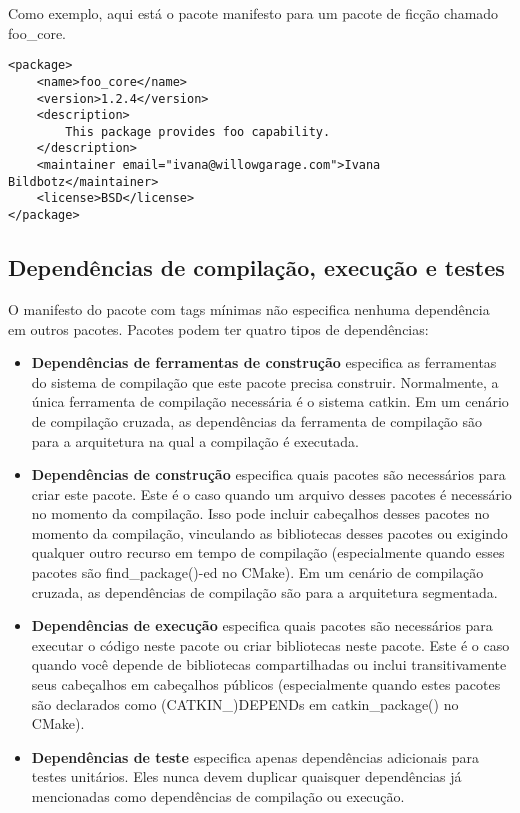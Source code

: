 Como exemplo, aqui está o pacote manifesto para um pacote de ficção chamado foo\_core.


\begin{verbatim}
<package>
	<name>foo_core</name>
	<version>1.2.4</version>
	<description>
		This package provides foo capability.
	</description>
	<maintainer email="ivana@willowgarage.com">Ivana Bildbotz</maintainer>
	<license>BSD</license>
</package>
\end{verbatim}

\subsection{Dependências de compilação, execução e testes}

O manifesto do pacote com tags mínimas não especifica nenhuma dependência em outros pacotes. Pacotes podem ter quatro tipos de dependências:

\begin{itemize}
	\setlength{\itemsep}{1pt}
	\setlength{\parskip}{0pt}
	\setlength{\parsep}{0pt}
	\item \textbf{Dependências de ferramentas de construção} 
	especifica as ferramentas do sistema de compilação que este pacote precisa construir. Normalmente, a única ferramenta de compilação necessária é o sistema catkin. Em um cenário de compilação cruzada, as dependências da ferramenta de compilação são para a arquitetura na qual a compilação é executada.
	\item \textbf{Dependências de construção} especifica quais pacotes são necessários para criar este pacote. Este é o caso quando um arquivo desses pacotes é necessário no momento da compilação. Isso pode incluir cabeçalhos desses pacotes no momento da compilação, vinculando as bibliotecas desses pacotes ou exigindo qualquer outro recurso em tempo de compilação (especialmente quando esses pacotes são find\_package()-ed no CMake). Em um cenário de compilação cruzada, as dependências de compilação são para a arquitetura segmentada.
	\item \textbf{Dependências de execução} especifica quais pacotes são necessários para executar o código neste pacote ou criar bibliotecas neste pacote. Este é o caso quando você depende de bibliotecas compartilhadas ou inclui transitivamente seus cabeçalhos em cabeçalhos públicos (especialmente quando estes pacotes são declarados como (CATKIN\_)DEPENDs em catkin\_package() no CMake).
	\item \textbf{Dependências de teste} especifica apenas dependências adicionais para testes unitários. Eles nunca devem duplicar quaisquer dependências já mencionadas como dependências de compilação ou execução.
\end{itemize}

